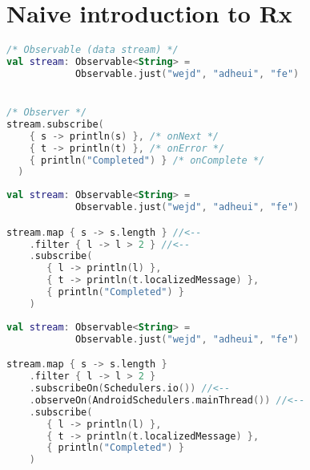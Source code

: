 \documentclass[10pt]{beamer}
\begin{document}
\section{Naive introduction to Rx}
\begin{frame}[fragile]
\begin{lstlisting}[language=Kotlin, basicstyle=\ttfamily]
/* Observable (data stream) */
val stream: Observable<String> =
            Observable.just("wejd", "adheui", "fe")


/* Observer */
stream.subscribe(
    { s -> println(s) }, /* onNext */
    { t -> println(t) }, /* onError */
    { println("Completed") } /* onComplete */
  )
\end{lstlisting} 
\end{frame}
\begin{frame}[fragile]
\begin{lstlisting}[language=Kotlin, basicstyle=\ttfamily]
val stream: Observable<String> =
            Observable.just("wejd", "adheui", "fe")

stream.map { s -> s.length } //<--
    .filter { l -> l > 2 } //<--
    .subscribe(
       { l -> println(l) },
       { t -> println(t.localizedMessage) },
       { println("Completed") }
    )
\end{lstlisting} 
\end{frame}
\begin{frame}[fragile]
\begin{lstlisting}[language=Kotlin, basicstyle=\ttfamily]
val stream: Observable<String> =
            Observable.just("wejd", "adheui", "fe")

stream.map { s -> s.length }
    .filter { l -> l > 2 }
    .subscribeOn(Schedulers.io()) //<--
    .observeOn(AndroidSchedulers.mainThread()) //<--
    .subscribe(
       { l -> println(l) },
       { t -> println(t.localizedMessage) },
       { println("Completed") }
    )
\end{lstlisting} 
\end{frame}
\end{document}
